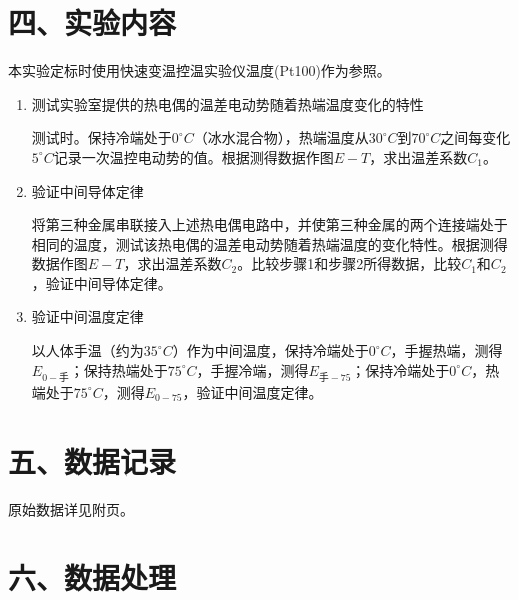 \documentclass[11pt]{article}
\begin{document}
\section*{四、实验内容}

本实验定标时使用快速变温控温实验仪温度(Pt100)作为参照。

\begin{enumerate}
    \item 测试实验室提供的热电偶的温差电动势随着热端温度变化的特性
    
    测试时。保持冷端处于$0^{\circ} C$（冰水混合物），热端温度从$30^{\circ} C$到$70^{\circ} C$之间每变化$5^{\circ} C$记录一次温控电动势的值。根据测得数据作图$E-T$，求出温差系数$C_1$。

    \item 验证中间导体定律
    
    将第三种金属串联接入上述热电偶电路中，并使第三种金属的两个连接端处于相同的温度，测试该热电偶的温差电动势随着热端温度的变化特性。根据测得数据作图$E-T$，求出温差系数$C_2$。比较步骤1和步骤2所得数据，比较$C_1$和$C_2$，验证中间导体定律。
    \item 验证中间温度定律
    
    以人体手温（约为$35^{\circ} C$）作为中间温度，保持冷端处于$0^{\circ} C$，手握热端，测得$E_{0-\text{手}}$；保持热端处于$75^{\circ} C$，手握冷端，测得$E_{\text{手}-75}$；保持冷端处于$0^{\circ} C$，热端处于$75^{\circ} C$，测得$E_{0-75}$，验证中间温度定律。
\end{enumerate}

\section*{五、数据记录}

原始数据详见附页。

\section*{六、数据处理}
\end{document}

